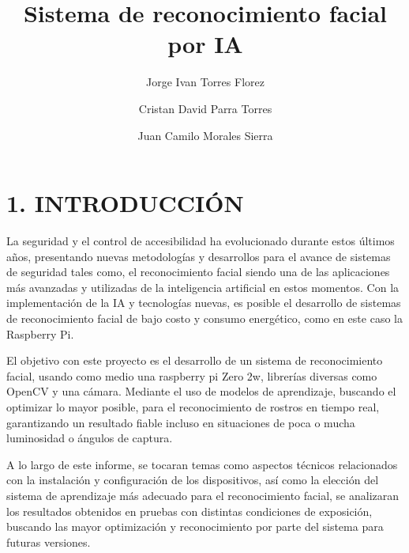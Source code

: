 \documentclass[esp]{ECCI-SIME-class}
\title{Sistema de reconocimiento facial por IA}
\author[1]{Jorge Ivan Torres Florez}
\author[2]{Cristan David Parra Torres}
\author[3]{Juan Camilo Morales Sierra}
\affil[1]{jorgei.torresf@ecci.edu.co, Ingenieria Electronica}
\affil[2]{cristiand.parrat@ecci.edu.co, Ingenieria Electronica}
\affil[2]{juanc.moraless@ecci.edu.co, Ingenieria Electronica}
\begin{document}




\maketitle
\thispagestyle{fancy}

\section{1.	INTRODUCCIÓN} 

La seguridad y el control de accesibilidad ha evolucionado durante estos últimos años, presentando nuevas metodologías y desarrollos para el avance de sistemas de seguridad tales como, el reconocimiento facial siendo una de las aplicaciones más avanzadas y utilizadas de la inteligencia artificial en estos momentos. Con la implementación de la IA y tecnologías nuevas, es posible el desarrollo de sistemas de reconocimiento facial de bajo costo y consumo energético, como en este caso la Raspberry Pi.

El objetivo con este proyecto es el desarrollo de un sistema de reconocimiento facial, usando como medio una raspberry pi Zero 2w, librerías diversas como OpenCV y una cámara. Mediante el uso de modelos de aprendizaje, buscando el optimizar lo mayor posible, para el reconocimiento de rostros en tiempo real, garantizando un resultado fiable incluso en situaciones de poca o mucha luminosidad o ángulos de captura.

A lo largo de este informe, se tocaran temas como aspectos técnicos relacionados con la instalación y configuración de los dispositivos, así como la elección del sistema de aprendizaje más adecuado para el reconocimiento facial, se analizaran los resultados obtenidos en pruebas con distintas condiciones de exposición, buscando las mayor optimización y reconocimiento por parte del sistema para futuras versiones.
\end{document}
